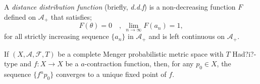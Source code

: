 \documentclass[10pt,a4paper]{amsart}
\begin{document}
\begin{definition}\label{ddf}
	A {\em distance distribution function} (briefly, {\em d.d.f}) is a non-decreasing function $F$ defined on $\mathcal{A}_+$ that satisfies;
	$$F(\theta)=0 \quad , \ \lim_{n\to \infty}F(a_n)=1,$$
	for all strictly increasing sequence $\{a_n\}$ in $\mathcal{A}_+$
	and is left continuous on $\mathcal{A}_+$. 
\end{definition}

\begin{theorem}\label{FB1}
	If  $(X,\mathcal{A},\mathcal{F},T)$ be a complete Menger probabilistic metric space with $T$ Had?i?-type and $f: X \to X$ be a $a$-contraction function, then, for any $p_0\in X$, the sequence $\{f^np_{0}\}$
	converges to a unique fixed point of $f$. 
\end{theorem}
\end{document}
